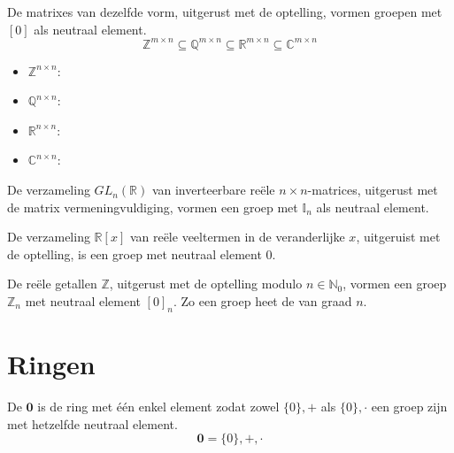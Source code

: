 \documentclass[main.tex]{subfiles}
\begin{document}
\begin{vb}
  De matrixes van dezelfde vorm, uitgerust met de optelling, vormen groepen met $[0]$ als neutraal element.
  \[ \mathbb{Z}^{m \times n} \subseteq \mathbb{Q}^{m \times n} \subseteq \mathbb{R}^{m \times n} \subseteq \mathbb{C}^{m \times n} \]
  \begin{itemize}
  \item $\mathbb{Z}^{n \times n}$: 
  \item $\mathbb{Q}^{n \times n}$: \cycln
  \item $\mathbb{R}^{n \times n}$: \cycln
  \item $\mathbb{C}^{n \times n}$: \cycln
  \end{itemize}
\commn
\end{vb}

\begin{vb}
  De verzameling $GL_{n}(\mathbb{R})$ van inverteerbare re\"ele $n\times n$-matrices, uitgerust met de matrix vermeningvuldiging, vormen een groep met $\mathbb{I}_{n}$ als neutraal element.\\
\commn \cycln
\end{vb}

\begin{vb}
  De verzameling $\mathbb{R}[x]$ van re\"ele veeltermen in de veranderlijke $x$, uitgeruist met de optelling, is een groep met neutraal element $0$.\\
\commj \cycln
\end{vb}

\begin{vb}
  De re\"ele getallen $\mathbb{Z}$, uitgerust met de optelling modulo $n\in \mathbb{N}_{0}$, vormen een groep $\mathbb{Z}_{n}$ met neutraal element $[0]_{n}$. Zo een groep heet de  van graad $n$.\\
\commj {}
\end{vb}

\section{Ringen}
\label{sec:ringen}

\begin{de}
  De  $\boldsymbol{0}$ is de ring met \'e\'en enkel element zodat zowel $\{0\},+$ als $\{0\},\cdot$ een groep zijn met hetzelfde neutraal element.
  \[ \boldsymbol{0} = \{0\},+,\cdot \]
  \commj
\end{de}
\end{document}
